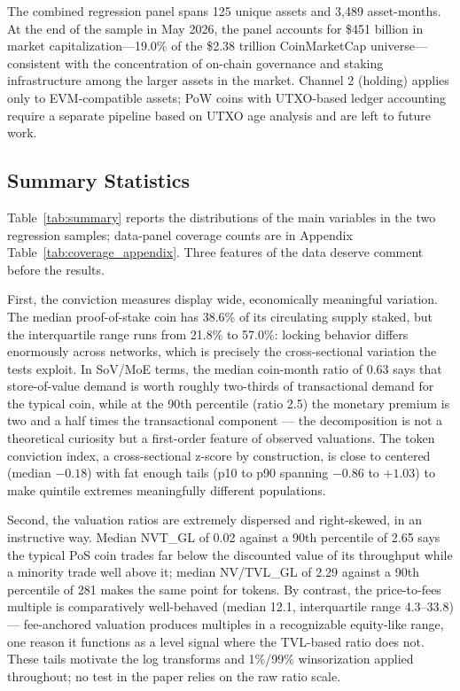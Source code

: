 \documentclass[12pt]{article}
\begin{document}
The combined regression panel spans 125 unique assets and 3,489 asset-months. At the end
of the sample in May 2026, the panel accounts for \$451 billion in market
capitalization---19.0\% of the \$2.38 trillion CoinMarketCap universe---consistent with
the concentration of on-chain governance and staking infrastructure among the larger
assets in the market. Channel 2 (holding) applies only to EVM-compatible assets; PoW
coins with UTXO-based ledger accounting require a separate pipeline based on UTXO age
analysis and are left to future work.

\subsection{Summary Statistics}
\label{sec:data_stats}

Table~\ref{tab:summary} reports the distributions of the main variables in the two
regression samples; data-panel coverage counts are in Appendix
Table~\ref{tab:coverage_appendix}. Three features of the data deserve comment before
the results.

First, the conviction measures display wide, economically meaningful variation. The
median proof-of-stake coin has 38.6\% of its circulating supply staked, but the
interquartile range runs from 21.8\% to 57.0\%: locking behavior differs enormously
across networks, which is precisely the cross-sectional variation the tests exploit.
In SoV/MoE terms, the median coin-month ratio of 0.63 says that store-of-value demand
is worth roughly two-thirds of transactional demand for the typical coin, while at the
90th percentile (ratio 2.5) the monetary premium is two and a half times the
transactional component --- the decomposition is not a theoretical curiosity but a
first-order feature of observed valuations. The token conviction index, a cross-sectional
z-score by construction, is close to centered (median $-0.18$) with fat enough tails
(p10 to p90 spanning $-0.86$ to $+1.03$) to make quintile extremes meaningfully
different populations.

Second, the valuation ratios are extremely dispersed and right-skewed, in an
instructive way. Median NVT\_GL of 0.02 against a 90th percentile of 2.65 says the
typical PoS coin trades far below the discounted value of its throughput while a
minority trade well above it; median NV/TVL\_GL of 2.29 against a 90th percentile of
281 makes the same point for tokens. By contrast, the price-to-fees multiple is
comparatively well-behaved (median 12.1, interquartile range 4.3--33.8) --- fee-anchored
valuation produces multiples in a recognizable equity-like range, one reason it
functions as a level signal where the TVL-based ratio does not. These tails motivate
the log transforms and 1\%/99\% winsorization applied throughout; no test in the paper
relies on the raw ratio scale.
\end{document}
